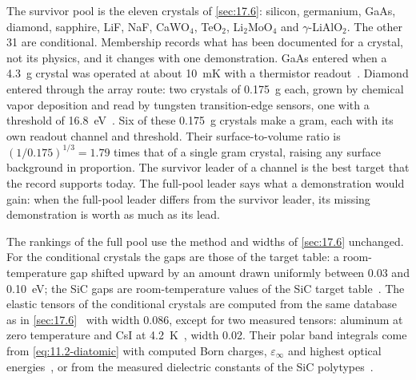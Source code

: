 The survivor pool is the eleven crystals of \cref{sec:17.6}: silicon, germanium, GaAs, diamond, sapphire, LiF, NaF, CaWO$_4$, TeO$_2$, Li$_2$MoO$_4$ and $\gamma$-LiAlO$_2$. The other 31 are conditional. Membership records what has been documented for a crystal, not its physics, and it changes with one demonstration. GaAs entered when a \SI{4.3}{g} crystal was operated at about \SI{10}{mK} with a thermistor readout~\cite{melchiorre2025first}. Diamond entered through the array route: two crystals of \SI{0.175}{g} each, grown by chemical vapor deposition and read by tungsten transition-edge sensors, one with a threshold of \SI{16.8}{eV}~\cite{angloher2023light}. Six of these \SI{0.175}{g} crystals make a gram, each with its own readout channel and threshold. Their surface-to-volume ratio is $(1/0.175)^{1/3} = 1.79$ times that of a single gram crystal, raising any surface background in proportion. The survivor leader of a channel is the best target that the record supports today. The full-pool leader says what a demonstration would gain: when the full-pool leader differs from the survivor leader, its missing demonstration is worth as much as its lead.

The rankings of the full pool use the method and widths of \cref{sec:17.6} unchanged. For the conditional crystals the gaps are those of the target table: a room-temperature gap shifted upward by an amount drawn uniformly between 0.03 and \SI{0.10}{eV}; the SiC gaps are room-temperature values of the SiC target table~\cite[Table~I]{griffin2021sic}. The elastic tensors of the conditional crystals are computed from the same database as in \cref{sec:17.6}~\cite{choudhary2018elastic} with width 0.086, except for two measured tensors: aluminum at zero temperature and CsI at \SI{4.2}{K}~\cite{vallin1964elastic}, width 0.02. Their polar band integrals come from \cref{eq:11.2-diatomic} with computed Born charges, $\varepsilon_\infty$ and highest optical energies~\cite[Table~I]{griffin2020multichannel}, or from the measured dielectric constants of the SiC polytypes~\cite[Table~I]{griffin2021sic}.


